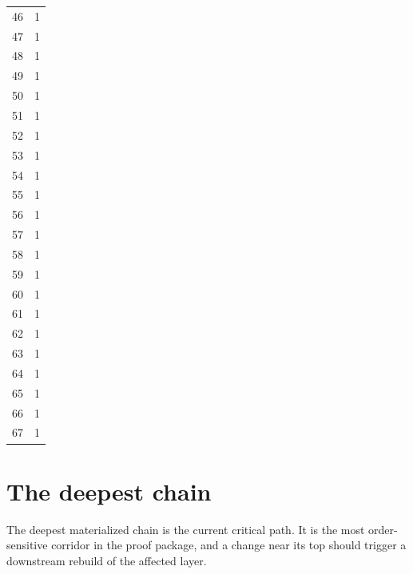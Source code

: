 \documentclass[11pt]{article}
\theoremstyle{remark}
\begin{document}
\begin{table}[H]
\begin{tabular}{rr}
46 & 1 \\
47 & 1 \\
48 & 1 \\
49 & 1 \\
50 & 1 \\
51 & 1 \\
52 & 1 \\
53 & 1 \\
54 & 1 \\
55 & 1 \\
56 & 1 \\
57 & 1 \\
58 & 1 \\
59 & 1 \\
60 & 1 \\
61 & 1 \\
62 & 1 \\
63 & 1 \\
64 & 1 \\
65 & 1 \\
66 & 1 \\
67 & 1 \\
\bottomrule
\end{tabular}
\end{table}

\section{The deepest chain}
\label{sec:deepest}

The deepest materialized chain is the current critical path. It is the most order-sensitive corridor in the proof package, and a change near its top should trigger a downstream rebuild of the affected layer.
\end{document}
